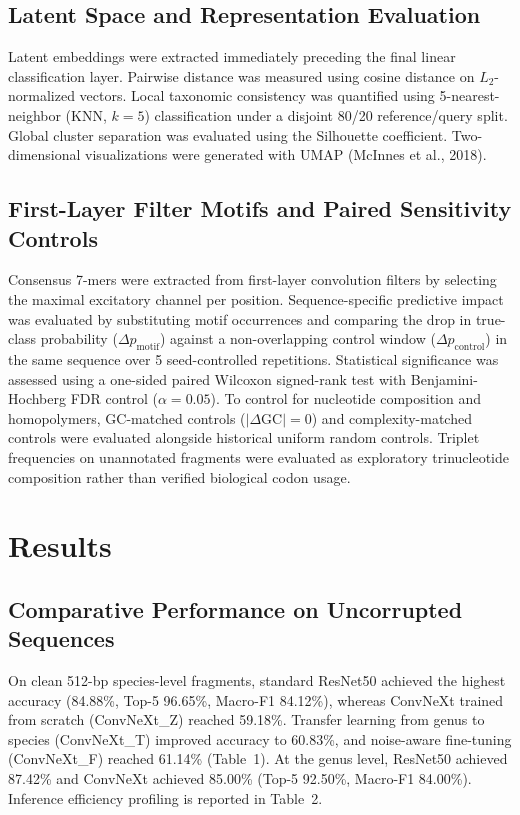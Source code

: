 \documentclass[11pt,a4paper]{article}
\begin{document}
\subsection{Latent Space and Representation Evaluation}
Latent embeddings were extracted immediately preceding the final linear classification layer. Pairwise distance was measured using cosine distance on $L_2$-normalized vectors. Local taxonomic consistency was quantified using 5-nearest-neighbor (KNN, $k=5$) classification under a disjoint 80/20 reference/query split. Global cluster separation was evaluated using the Silhouette coefficient. Two-dimensional visualizations were generated with UMAP (McInnes et al., 2018).



\subsection{First-Layer Filter Motifs and Paired Sensitivity Controls}
Consensus 7-mers were extracted from first-layer convolution filters by selecting the maximal excitatory channel per position. Sequence-specific predictive impact was evaluated by substituting motif occurrences and comparing the drop in true-class probability ($\Delta p_{\text{motif}}$) against a non-overlapping control window ($\Delta p_{\text{control}}$) in the same sequence over 5 seed-controlled repetitions. Statistical significance was assessed using a one-sided paired Wilcoxon signed-rank test with Benjamini-Hochberg FDR control ($\alpha=0.05$).
To control for nucleotide composition and homopolymers, GC-matched controls ($|\Delta\text{GC}| = 0$) and complexity-matched controls were evaluated alongside historical uniform random controls. Triplet frequencies on unannotated fragments were evaluated as exploratory trinucleotide composition rather than verified biological codon usage.




\section{Results}

\subsection{Comparative Performance on Uncorrupted Sequences}
On clean 512-bp species-level fragments, standard ResNet50 achieved the highest accuracy (84.88\%, Top-5 96.65\%, Macro-F1 84.12\%), whereas ConvNeXt trained from scratch (ConvNeXt\_Z) reached 59.18\%. Transfer learning from genus to species (ConvNeXt\_T) improved accuracy to 60.83\%, and noise-aware fine-tuning (ConvNeXt\_F) reached 61.14\% (Table~1). At the genus level, ResNet50 achieved 87.42\% and ConvNeXt achieved 85.00\% (Top-5 92.50\%, Macro-F1 84.00\%).
Inference efficiency profiling is reported in Table~2.
\end{document}

